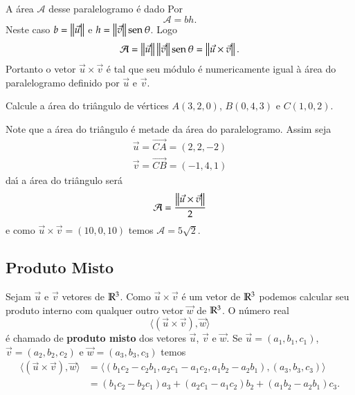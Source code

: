 A \'area $\mathcal{A}$ desse paralelogramo \'e dado Por
\[
  \mathcal{A} = bh.
\]
Neste caso $b = \left\Vert{\vec{u}}\right\Vert$ e $h = \left\Vert{\vec{v}}\right\Vert{\rm sen\,}\theta$. Logo
\[
  \mathcal{A} = \left\Vert{\vec{u}}\right\Vert\left\Vert{\vec{v}}\right\Vert{\rm sen\,}\theta = \left\Vert{\vec{u}\times\vec{v}}\right\Vert.
\]
Portanto o vetor $\vec{u}\times\vec{v}$ \'e tal que seu m\'odulo \'e numericamente igual \`a \'area do paralelogramo definido por $\vec{u}$ e $\vec{v}$.
\begin{exemplo}
  Calcule a \'area do tri\^angulo de v\'ertices $A(3,2,0)$, $B(0,4,3)$ e $C(1,0,2)$.
  \begin{solucao}
    Note que a \'area do tri\^angulo \'e metade da \'area do paralelogramo. Assim seja
    \begin{align*}
      \vec{u} = \vec{CA} = (2,2,-2)\\
      \vec{v} = \vec{CB} = (-1,4,1)
    \end{align*}
    da{\'\i} a \'area do tri\^angulo ser\'a
    \[
      \mathcal{A} = \dfrac{\left\Vert{\vec{u}\times\vec{v}}\right\Vert}{2}
    \]
    e como $\vec{u}\times\vec{v} = (10,0,10)$ temos $\mathcal{A} = 5\sqrt{2}$.
  \end{solucao}
\end{exemplo}

\subsection{Produto Misto} %
\label{sub:produto_misto}

Sejam $\vec{u}$ e $\vec{v}$ vetores de $\mathbb{R}^3$. Como $\vec{u}\times\vec{v}$ \'e um vetor de $\mathbb{R}^3$ podemos calcular seu produto interno com qualquer outro vetor $\vec{w}$ de $\mathbb{R}^3$. O n\'umero real
\begin{equation}
  \langle(\vec{u}\times\vec{v}), \vec{w}\rangle
\end{equation}
\'e chamado de \textbf{produto misto} dos vetores $\vec{u}$, $\vec{v}$ e $\vec{w}$. Se $\vec{u} = (a_1,b_1,c_1)$, $\vec{v} =(a_2,b_2,c_2)$ e $\vec{w} = (a_3,b_3,c_3)$ temos
\begin{align*}
  \langle(\vec{u}\times\vec{v}), \vec{w}\rangle &= \langle(b_1c_2 - c_2b_1,a_2c_1 - a_1c_2, a_1b_2 - a_2b_1), (a_3, b_3, c_3)\rangle \\ &= (b_1c_2 - b_2c_1)a_3 + (a_2c_1 - a_1c_2)b_2 + (a_1b_2 - a_2b_1)c_3.
\end{align*}

